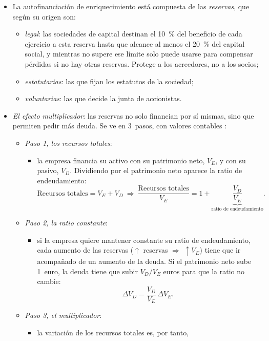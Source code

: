 \documentclass[11pt]{article}
\begin{document}
\begin{itemize}
\item La autofinanciación de enriquecimiento está compuesta de las \emph{reservas}, que según su origen son:
  \begin{itemize}
  \item \emph{legal}: las sociedades de capital destinan el 10~\% del beneficio de cada ejercicio a esta reserva hasta que alcance al menos el 20~\% del capital social, y mientras no supere ese límite solo puede usarse para compensar pérdidas si no hay otras reservas\nocite{LSC2010}. Protege a los acreedores, no a los socios;
  \item \emph{estatutarias}: las que fijan los estatutos de la sociedad;
  \item \emph{voluntarias}: las que decide la junta de accionistas.
  \end{itemize}
\item \emph{El efecto multiplicador}: las reservas no solo financian por sí mismas, sino que permiten pedir más deuda. Se ve en 3~pasos, con valores contables :
  \begin{itemize}
  \item \emph{Paso 1, los recursos totales}:
    \begin{itemize}
    \item la empresa financia su activo con su patrimonio neto, $V_E$, y con su pasivo, $V_D$. Dividiendo por el patrimonio neto aparece la ratio de endeudamiento:
    \[
    \text{Recursos totales}=V_E+V_D\ \Longrightarrow\ \frac{\text{Recursos totales}}{V_E}=1+\underbrace{\frac{V_D}{V_E}}_{\text{ratio de endeudamiento}}.
    \]
    \end{itemize}
  \item \emph{Paso 2, la ratio constante}:
    \begin{itemize}
    \item si la empresa quiere mantener constante su ratio de endeudamiento, cada aumento de las reservas ($\uparrow$ reservas $\Rightarrow$ $\uparrow V_E$) tiene que ir acompañado de un aumento de la deuda. Si el patrimonio neto sube 1~euro, la deuda tiene que subir $V_D/V_E$ euros para que la ratio no cambie:
    \[
    \Delta V_D=\frac{V_D}{V_E}\,\Delta V_E.
    \]
    \end{itemize}
  \item \emph{Paso 3, el multiplicador}:
    \begin{itemize}
    \item la variación de los recursos totales es, por tanto,

\end{itemize}
\end{itemize}
\end{itemize}
\end{document}
